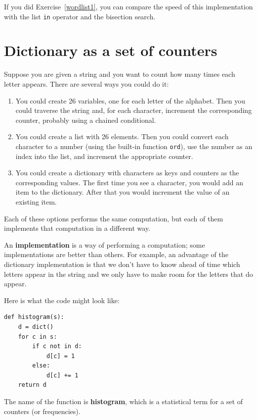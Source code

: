 \documentclass[10pt]{book}
\begin{document}
\begin{CJK}{UTF8}{gbsn}
\begin{exercise}
If you did Exercise~\ref{wordlist1}, you can compare the speed
of this implementation with the list {\tt in} operator and the
bisection search.

\end{exercise}


\section{Dictionary as a set of counters}
\label{histogram}

Suppose you are given a string and you want to count how many
times each letter appears.  There are several ways you could do it:

\begin{enumerate}

\item You could create 26 variables, one for each letter of the
alphabet.  Then you could traverse the string and, for each
character, increment the corresponding counter, probably using
a chained conditional.

\item You could create a list with 26 elements.  Then you could
convert each character to a number (using the built-in function
{\tt ord}), use the number as an index into the list, and increment
the appropriate counter.

\item You could create a dictionary with characters as keys
and counters as the corresponding values.  The first time you
see a character, you would add an item to the dictionary.  After
that you would increment the value of an existing item.

\end{enumerate}

Each of these options performs the same computation, but each
of them implements that computation in a different way.

An {\bf implementation} is a way of performing a computation;
some implementations are better than others.  For example,
an advantage of the dictionary implementation is that we don't
have to know ahead of time which letters appear in the string
and we only have to make room for the letters that do appear.

Here is what the code might look like:

\begin{verbatim}
def histogram(s):
    d = dict()
    for c in s:
        if c not in d:
            d[c] = 1
        else:
            d[c] += 1
    return d
\end{verbatim}
%
The name of the function is {\bf histogram}, which is a statistical
term for a set of counters (or frequencies).


\end{CJK}
\end{document}
